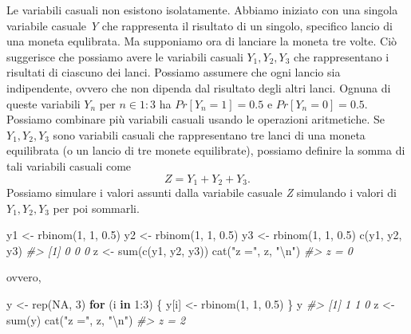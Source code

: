\documentclass[
  10pt,
  italian,
  a4paper,
  extrafontsizes,onecolumn,openright
  ]{memoir}
\newenvironment{Shaded}{\begin{snugshade}}{\end{snugshade}}
\newcommand{\CommentTok}[1]{\textcolor[rgb]{0.56,0.35,0.01}{\textit{#1}}}
\newcommand{\ConstantTok}[1]{\textcolor[rgb]{0.00,0.00,0.00}{#1}}
\newcommand{\ControlFlowTok}[1]{\textcolor[rgb]{0.13,0.29,0.53}{\textbf{#1}}}
\newcommand{\DecValTok}[1]{\textcolor[rgb]{0.00,0.00,0.81}{#1}}
\newcommand{\FloatTok}[1]{\textcolor[rgb]{0.00,0.00,0.81}{#1}}
\newcommand{\FunctionTok}[1]{\textcolor[rgb]{0.00,0.00,0.00}{#1}}
\newcommand{\NormalTok}[1]{#1}
\newcommand{\OtherTok}[1]{\textcolor[rgb]{0.56,0.35,0.01}{#1}}
\newcommand{\SpecialCharTok}[1]{\textcolor[rgb]{0.00,0.00,0.00}{#1}}
\newcommand{\StringTok}[1]{\textcolor[rgb]{0.31,0.60,0.02}{#1}}
\theoremstyle{definition}
\theoremstyle{definition}
\theoremstyle{definition}
\theoremstyle{definition}
\theoremstyle{remark}
\begin{document}
Le variabili casuali non esistono isolatamente. Abbiamo iniziato con una singola variabile casuale \emph{Y} che rappresenta il risultato di un singolo, specifico lancio di una moneta equlibrata. Ma supponiamo ora di lanciare la moneta tre volte. Ciò suggerisce che possiamo avere le variabili casuali \(Y_1 , Y_2 , Y_3\) che rappresentano i risultati di ciascuno dei lanci. Possiamo assumere che ogni lancio sia indipendente, ovvero che non dipenda dal risultato degli altri lanci. Ognuna di queste variabili \(Y_n\) per \(n \in 1:3\) ha \(Pr[Y_n =1]=0.5\) e \(Pr[Y_n =0]=0.5\). Possiamo combinare più variabili casuali usando le operazioni aritmetiche. Se \(Y_1 , Y_2, Y_3\) sono variabili casuali che rappresentano tre lanci di una moneta equilibrata (o un lancio di tre monete equilibrate), possiamo definire la somma di tali variabili casuali come
\[
Z = Y_1 + Y_2 + Y_3.
\]
\noindent
Possiamo simulare i valori assunti dalla variabile casuale \emph{Z} simulando i valori di \(Y_1, Y_2, Y_3\) per poi sommarli.

\begin{Shaded}
\begin{Highlighting}[]
\NormalTok{y1 }\OtherTok{\textless{}{-}} \FunctionTok{rbinom}\NormalTok{(}\DecValTok{1}\NormalTok{, }\DecValTok{1}\NormalTok{, }\FloatTok{0.5}\NormalTok{)}
\NormalTok{y2 }\OtherTok{\textless{}{-}} \FunctionTok{rbinom}\NormalTok{(}\DecValTok{1}\NormalTok{, }\DecValTok{1}\NormalTok{, }\FloatTok{0.5}\NormalTok{)}
\NormalTok{y3 }\OtherTok{\textless{}{-}} \FunctionTok{rbinom}\NormalTok{(}\DecValTok{1}\NormalTok{, }\DecValTok{1}\NormalTok{, }\FloatTok{0.5}\NormalTok{)}
\FunctionTok{c}\NormalTok{(y1, y2, y3)}
\CommentTok{\#\textgreater{} [1] 0 0 0}
\NormalTok{z }\OtherTok{\textless{}{-}} \FunctionTok{sum}\NormalTok{(}\FunctionTok{c}\NormalTok{(y1, y2, y3))}
\FunctionTok{cat}\NormalTok{(}\StringTok{"z ="}\NormalTok{, z, }\StringTok{"}\SpecialCharTok{\textbackslash{}n}\StringTok{"}\NormalTok{)}
\CommentTok{\#\textgreater{} z = 0}
\end{Highlighting}
\end{Shaded}

\noindent
ovvero,

\begin{Shaded}
\begin{Highlighting}[]
\NormalTok{y }\OtherTok{\textless{}{-}} \FunctionTok{rep}\NormalTok{(}\ConstantTok{NA}\NormalTok{, }\DecValTok{3}\NormalTok{)}
\ControlFlowTok{for}\NormalTok{ (i }\ControlFlowTok{in} \DecValTok{1}\SpecialCharTok{:}\DecValTok{3}\NormalTok{) \{}
\NormalTok{  y[i] }\OtherTok{\textless{}{-}} \FunctionTok{rbinom}\NormalTok{(}\DecValTok{1}\NormalTok{, }\DecValTok{1}\NormalTok{, }\FloatTok{0.5}\NormalTok{)}
\NormalTok{\}}
\NormalTok{y}
\CommentTok{\#\textgreater{} [1] 1 1 0}
\NormalTok{z }\OtherTok{\textless{}{-}} \FunctionTok{sum}\NormalTok{(y)}
\FunctionTok{cat}\NormalTok{(}\StringTok{"z ="}\NormalTok{, z, }\StringTok{"}\SpecialCharTok{\textbackslash{}n}\StringTok{"}\NormalTok{)}
\CommentTok{\#\textgreater{} z = 2}
\end{Highlighting}
\end{Shaded}
\end{document}
